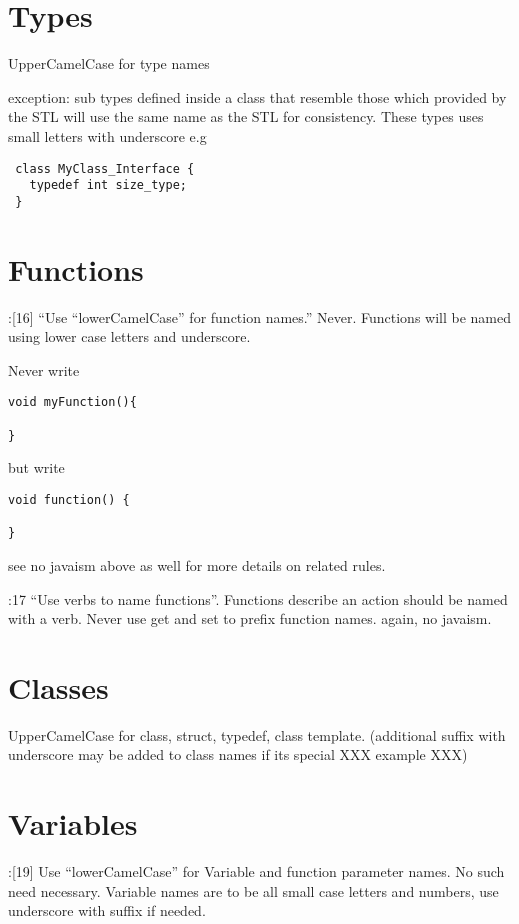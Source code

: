 \documentclass{book}
\begin{document}
\section{Types}
\label{sec:TypeNames}

UpperCamelCase for type names

exception: sub types defined inside a class that resemble those which provided by the STL will use the same name as the STL for consistency. These types uses small letters with underscore e.g

\begin{verbatim}
 class MyClass_Interface {
   typedef int size_type;
 }
\end{verbatim}



\section{Functions}
\label{sec:FuncNames}

\cite{OKL_MisfeldtBumgardnerGray2004CppStyle}:[16] ``Use ``lowerCamelCase'' for function names.'' Never. Functions will be named using lower case letters and underscore.

Never write

\begin{verbatim}
void myFunction(){

}
\end{verbatim}

but write

\begin{verbatim}
void function() {

}
\end{verbatim}

see no javaism above as well for more details on related rules.

\cite{OKL_MisfeldtBumgardnerGray2004CppStyle}:17 ``Use verbs to name functions''. Functions describe an action should be named with a verb. Never use get and set to prefix function names. again, no javaism.

\section{Classes}
\label{sec:ClassNames}

UpperCamelCase for class, struct, typedef, class template. (additional suffix with underscore may be added to class names if its special XXX example XXX)

\section{Variables}
\label{sec:VariableNames}
\cite{OKL_MisfeldtBumgardnerGray2004CppStyle}:[19] Use ``lowerCamelCase'' for Variable and function parameter names. No such need necessary. Variable names are to be all small case letters and numbers, use underscore with suffix if needed.
\end{document}
